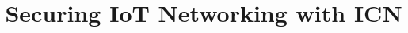 \documentclass[journal]{IEEEtran}
\begin{document}
\title{Securing IoT Networking with ICN
}

\author{


}
\maketitle

\begin{abstract}

\end{abstract}








\ifCLASSOPTIONcaptionsoff
  \newpage
\fi



\end{document}
